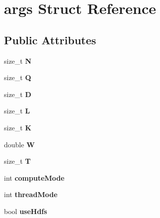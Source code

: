 \hypertarget{structargs}{}\section{args Struct Reference}
\label{structargs}
\subsection*{Public Attributes}
\begin{DoxyCompactItemize}
\item 
size\+\_\+t {\bfseries N}\hypertarget{structargs_a45b7b906b50c7fe736a5b909b8ebf15f}{}\label{structargs_a45b7b906b50c7fe736a5b909b8ebf15f}

\item 
size\+\_\+t {\bfseries Q}\hypertarget{structargs_a761456db62f9009a90874a541f05be80}{}\label{structargs_a761456db62f9009a90874a541f05be80}

\item 
size\+\_\+t {\bfseries D}\hypertarget{structargs_ad3684c9bad0f82627f6dcec89118a268}{}\label{structargs_ad3684c9bad0f82627f6dcec89118a268}

\item 
size\+\_\+t {\bfseries L}\hypertarget{structargs_a64641a6b7ca4184422ded615ca2cefc9}{}\label{structargs_a64641a6b7ca4184422ded615ca2cefc9}

\item 
size\+\_\+t {\bfseries K}\hypertarget{structargs_a76d1d0f55ea20df70244d06b45426462}{}\label{structargs_a76d1d0f55ea20df70244d06b45426462}

\item 
double {\bfseries W}\hypertarget{structargs_a638e4e75d7addd1a226b836827dc2d3d}{}\label{structargs_a638e4e75d7addd1a226b836827dc2d3d}

\item 
size\+\_\+t {\bfseries T}\hypertarget{structargs_ab41fd7072045b5878a94b3c58ac2fb5c}{}\label{structargs_ab41fd7072045b5878a94b3c58ac2fb5c}

\item 
int {\bfseries compute\+Mode}\hypertarget{structargs_a1573c290fd60933d45e00898e34986e7}{}\label{structargs_a1573c290fd60933d45e00898e34986e7}

\item 
int {\bfseries thread\+Mode}\hypertarget{structargs_ac5659d03e21d9fe44d617bfec99cdd83}{}\label{structargs_ac5659d03e21d9fe44d617bfec99cdd83}

\item 
bool {\bfseries use\+Hdfs}\hypertarget{structargs_afbb20c3325306bf9bb4f2b66a0792e70}{}\label{structargs_afbb20c3325306bf9bb4f2b66a0792e70}


\end{DoxyCompactItemize}
